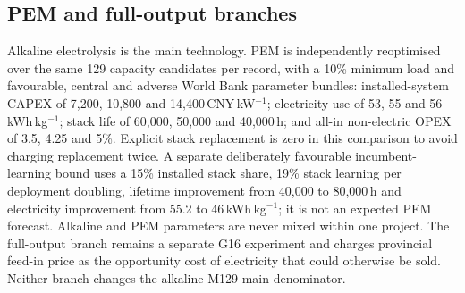 \documentclass[pdflatex,sn-nature]{sn-jnl}
\begin{document}
\subsection{PEM and full-output branches}

Alkaline electrolysis is the main technology. PEM is independently reoptimised over the same 129 capacity candidates per record, with a 10\% minimum load and favourable, central and adverse World Bank parameter bundles: installed-system CAPEX of 7,200, 10,800 and 14,400\,CNY\,kW$^{-1}$; electricity use of 53, 55 and 56\,kWh\,kg$^{-1}$; stack life of 60,000, 50,000 and 40,000\,h; and all-in non-electric OPEX of 3.5, 4.25 and 5\%\cite{worldbank2026}. Explicit stack replacement is zero in this comparison to avoid charging replacement twice. A separate deliberately favourable incumbent-learning bound uses a 15\% installed stack share, 19\% stack learning per deployment doubling, lifetime improvement from 40,000 to 80,000\,h and electricity improvement from 55.2 to 46\,kWh\,kg$^{-1}$; it is not an expected PEM forecast. Alkaline and PEM parameters are never mixed within one project. The full-output branch remains a separate G16 experiment and charges provincial feed-in price as the opportunity cost of electricity that could otherwise be sold. Neither branch changes the alkaline M129 main denominator.
\end{document}
